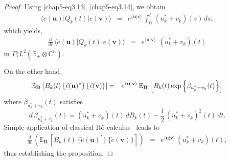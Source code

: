 \begin{proof}
Using \eqref{chap5-eq3.13}, \eqref{chap5-eq3.14}, we obtain 
\begin{eqnarray} 
\langle e(\mathbf{u})\vert Q_k(t)\vert e(\mathbf{v})\rangle &=& e^{\langle \mathbf{u}\vert \mathbf{v}\rangle}\,\int_{0}^{t}\, (u^*_k+v_k)(s)\, ds, \label{chap5-eq5.7}
\end{eqnarray}
which yields, 
\begin{eqnarray}
\frac{d}{dt}\,\langle e(\mathbf{u})\vert Q_k(t)\vert e(\mathbf{v})\rangle &=& e^{\langle \mathbf{u}\vert \mathbf{v}\rangle}\ \, (u^*_k+v_k)(t) \label{chap5-eq5.8}
\end{eqnarray}
in $\Gamma(L^2(\mathbb{R}_+\otimes \mathbb{C}^n).$

On the other hand,   
\begin{eqnarray} 
\mathbb{E}_{\mathbf{B}}\,\left[B_k(t)\,\{\widetilde{e}(\mathbf{u})^{*}\}\, \{\widetilde{e}(\mathbf{v})\}\right]&=& e^{\langle \mathbf{u}\vert \mathbf{v}\rangle}\, \mathbb{E}_{\mathbf{B}}\, \left[B_k(t)\, {\rm exp}\left\{\beta_{u_k^*+v_k}(t)\right\}\right]  \label{chap5-eq5.9}
\end{eqnarray}  
where  $\beta_{u_k^*+v_k}(t)$ satisfies   
\begin{equation}
d\, \beta_{u_k^*+v_k}(t)= (u^*_k+v_k)(t)\, dB_k(t) - \frac{1}{2} \, (u^*_k+v_k)^2(t)\, dt.  \label{chap5-eq5.10}
\end{equation}
Simple application of classical It{\^o} calculus~\cite{key38} leads to
\begin{eqnarray}
\frac{d}{dt}\, \left(\mathbb{E}_{\mathbf{B}}\,\left[B_k(t)\,\{\widetilde{e}(\mathbf{u})^{*}\}\, \{\widetilde{e}(\mathbf{v})\}\right]\right)&=& e^{\langle \mathbf{u}\vert \mathbf{v}\rangle}\, (u^*_k+v_k)(t), \label{chap5-eq5.11}
\end{eqnarray}
thus establishing the proposition.
\end{proof}

